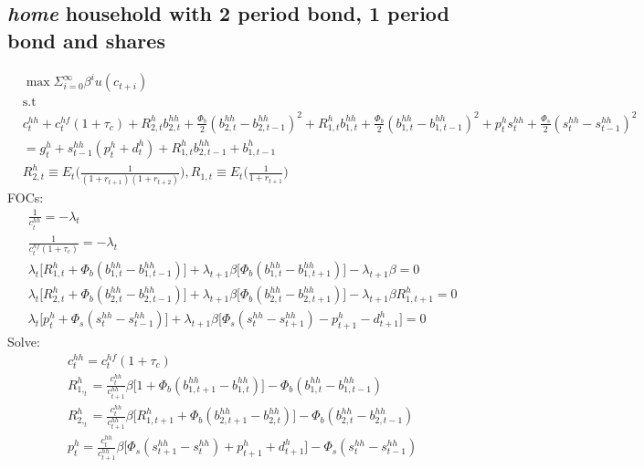 \documentclass[a4paper]{article}
\begin{document}
\subsection{\emph{home} household with 2 period bond, 1 period bond and shares}
\begin{align*}
&\max \Sigma_{i=0}^\infty \beta^i u(c_{t+i})\\ &\text{s.t}\\
&c^{hh}_t+c^{hf}_t(1+\tau_c)+R^h_{2,t} b^{hh}_{2,t} + \frac{\Phi_b}{2}(b^{hh}_{2,t}-b^{hh}_{2,t-1})^2 +
R^h_{1,t} b^{hh}_{1,t} + \frac{\Phi_b}{2}(b^{hh}_{1,t}-b^{hh}_{1,t-1})^2 + p^{h}_t s^{hh}_t+\frac{\Phi_s}{2}(s^{hh}_t-s^{hh}_{t-1})^2\\
&=g^h_t+s^{hh}_{t-1}(p^{h}_t+d^{h}_t)+R^{h}_{1,t}b^{hh}_{2,t-1}+b^h_{1,t-1}\\
&R^h_{2,t} \equiv E_t\bigg(\frac{1}{(1+r_{t+1})(1+r_{t+2})} \bigg), R_{1,t} \equiv E_t\bigg(\frac{1}{1+r_{t+1}} \bigg)
\end{align*}
FOCs:
\begin{align*}
&\frac{1}{c^{hh}_t}=-\lambda_t\\
&\frac{1}{c^{hf}_t(1+\tau_c)}=-\lambda_t \\
&\lambda_t\big[R^h_{1,t}+\Phi_b (b^{hh}_{1,t}-b^{hh}_{1,t-1})\big ]+ \lambda_{t+1} \beta \big[\Phi_b (b^{hh}_{1,t} - b^{hh}_{1,t+1})]-\lambda_{t+1}\beta =0\\
&\lambda_t\big[R^h_{2,t}+\Phi_b (b^{hh}_{2,t}-b^{hh}_{2,t-1})\big ]+ \lambda_{t+1} \beta \big[\Phi_b (b^{hh}_{2,t} - b^{hh}_{2,t+1})]-\lambda_{t+1}\beta R^{h}_{1,t+1}=0\\
&\lambda_t \big[p^{h}_t + \Phi_s (s^{hh}_t-s^{hh}_{t-1})\big] + \lambda_{t+1} \beta \big[\Phi_s  (s^{hh}_t-s^{hh}_{t+1}) - p^{h}_{t+1}-d^{h}_{t+1}\big]=0
\end{align*}
Solve:
\begin{align}
&c^{hh}_t=c^{hf}_t(1+\tau_c)\\
&R^h_{1,_t}=\frac{c^{hh}_t}{c^{hh}_{t+1}}\beta \big[1+\Phi_b (b^{hh}_{1,t+1} - b^{hh}_{1,t})\big] -\Phi_b (b^{hh}_{1,t}-b^{hh}_{1,t-1})\\
&R^h_{2,_t}=\frac{c^{hh}_t}{c^{hh}_{t+1}}\beta \big[R^{h}_{1,t+1}+\Phi_b (b^{hh}_{2,t+1} - b^{hh}_{2,t})\big] -\Phi_b (b^{hh}_{2,t}-b^{hh}_{2,t-1})\\
&p^{h}_t=\frac{c^{hh}_t}{c^{hh}_{t+1}}\beta \bigg[ \Phi_s (s^{hh}_{t+1}-s^{hh}_t)+p^{h}_{t+1}+d^{h}_{t+1} \bigg] - \Phi_s (s^{hh}_t - s^{hh}_{t-1})
\end{align}
\end{document}
